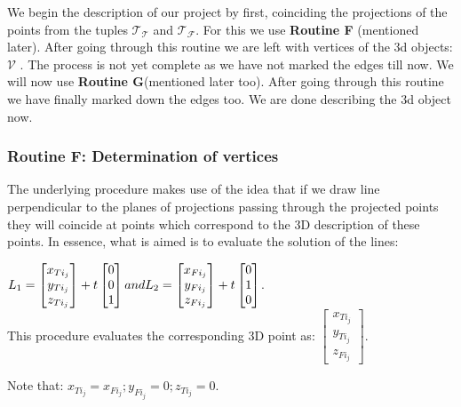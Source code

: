 \documentclass[12pt]{report}
\begin{document}
We begin the description of our project by first, coinciding the projections of the points from the tuples \(\mathcal{T_{T}}\) and \(\mathcal{T_{F}}\).
For this we use \textbf{Routine F} (mentioned later). After going through this routine we are left with vertices  of the 3d objects: \(\mathcal{V}\) . The process is not yet complete as we have not marked the edges till now. We will now use \textbf{Routine G}(mentioned later too). After going through this routine we have finally marked down the edges too. We are done describing the 3d object now.

\subsubsection*{Routine F: Determination of vertices}
The underlying procedure makes use of the idea that if we draw line perpendicular to the planes of projections passing through the projected points they will coincide at points which correspond to the 3D description of these points. In essence, what is aimed is to evaluate the solution of the lines: \\
\begin{center}
\(L_{1} = \begin{bmatrix}  x_{Ti_{j}} \\ y_{Ti_{j}} \\ z_{Ti_{j}} \\ \end{bmatrix} + t \begin{bmatrix} 0 \\ 0 \\ 1 \end{bmatrix} \space and \space L_{2} = \begin{bmatrix}  x_{Fi_{j}} \\ y_{Fi_{j}} \\ z_{Fi_{j}} \\ \end{bmatrix} + t \begin{bmatrix} 0 \\ 1 \\ 0 \end{bmatrix} \).\\
This procedure evaluates the corresponding 3D point as:
\(\begin{bmatrix}  x_{Ti_{j}} \\ y_{Ti_{j}} \\ z_{Fi_{j}} \end{bmatrix} \). 
\end{center}
Note that: \(x_{Ti_{j}} = x_{Fi_{j}}; y_{Fi_{j}} = 0; z_{Ti_{j}} = 0. \)
\end{document}
